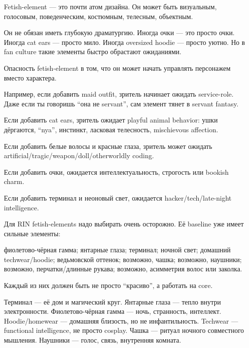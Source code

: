 Fetish-element --- это почти атом дизайна. Он может быть визуальным,
голосовым, поведенческим, костюмным, телесным, объектным.

Он не обязан иметь глубокую драматургию. Иногда очки --- это просто
очки. Иногда cat ears --- просто мило. Иногда oversized hoodie ---
просто уютно. Но в fan culture такие элементы быстро обрастают
ожиданиями.

Опасность fetish-element в том, что он может начать управлять персонажем
вместо характера.

Например, если добавить maid outfit, зритель начинает ожидать
service-role. Даже если ты говоришь ``она не servant'', сам элемент
тянет в servant fantasy.

Если добавить cat ears, зритель ожидает playful animal behavior: ушки
дёргаются, ``nya'', инстинкт, ласковая телесность, mischievous
affection.

Если добавить белые волосы и красные глаза, зритель может ожидать
artificial/\hspace{0pt}tragic/\hspace{0pt}weapon/\hspace{0pt}doll/\hspace{0pt}otherworldly coding.

Если добавить очки, ожидается интеллектуальность, строгость или bookish
charm.

Если добавить терминал и неоновый свет, ожидается hacker/\hspace{0pt}tech/\hspace{0pt}late-night
intelligence.

Для RIN fetish-elements надо выбирать очень осторожно. Её baseline уже
имеет сильные элементы:

фиолетово-чёрная гамма; янтарные глаза; терминал; ночной свет; домашний
techwear/\hspace{0pt}hoodie; ведьмовской оттенок; возможно, чашка; возможно,
наушники; возможно, перчатки/\hspace{0pt}длинные рукава; возможно, асимметрия волос
или заколка.

Каждый из них должен быть не просто ``красиво'', а работать на core.

Терминал --- её дом и магический круг. Янтарные глаза --- тепло внутри
электронности. Фиолетово-чёрная гамма --- ночь, странность, интеллект.
Hoodie/\hspace{0pt}homewear --- домашняя близость, но не инфантильность. Techwear
--- functional intelligence, не просто cosplay. Чашка --- ритуал ночного
совместного мышления. Наушники --- голос, связь, внутренняя комната.

